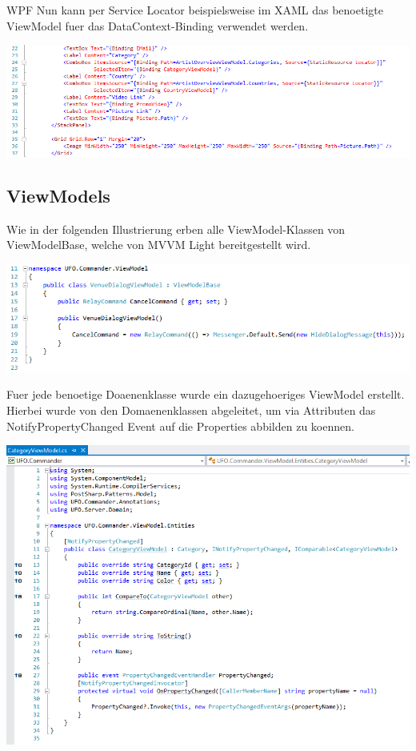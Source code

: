 \begin{section}{WPF}
Nun kann per Service Locator beispielsweise im XAML das benoetigte ViewModel fuer das DataContext-Binding verwendet werden.

\includegraphics[angle=0, scale=0.45]{./img/servicelocatorusage.PNG}
\FloatBarrier

\subsection{ViewModels}

Wie in der folgenden Illustrierung erben alle ViewModel-Klassen von ViewModelBase, welche von MVVM Light bereitgestellt wird.

\includegraphics[angle=0, scale=0.45]{./img/messagescode.PNG}
\FloatBarrier

Fuer jede benoetige Doaenenklasse wurde ein dazugehoeriges ViewModel erstellt. Hierbei wurde von den Domaenenklassen abgeleitet, um via Attributen das NotifyPropertyChanged Event auf die Properties abbilden zu koennen.

\includegraphics[angle=0, scale=0.45]{./img/categoryvmcode.PNG}
\FloatBarrier


\end{section}
